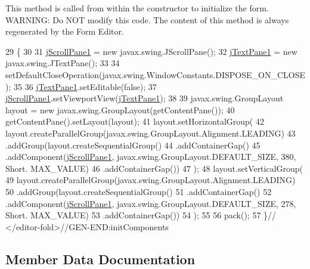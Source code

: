 This method is called from within the constructor to initialize the form. W\+A\+R\+N\+I\+NG\+: Do N\+OT modify this code. The content of this method is always regenerated by the Form Editor. 
\begin{DoxyCode}
29                                   \{
30 
31         \mbox{\hyperlink{class_interfaz_1_1_mensaje_a7da6f30c05a1006cde5b42ccfb671ee9}{jScrollPane1}} = \textcolor{keyword}{new} javax.swing.JScrollPane();
32         \mbox{\hyperlink{class_interfaz_1_1_mensaje_abbd0afdc912a7465ded350b063ae1a4e}{jTextPane1}} = \textcolor{keyword}{new} javax.swing.JTextPane();
33 
34         setDefaultCloseOperation(javax.swing.WindowConstants.DISPOSE\_ON\_CLOSE);
35 
36         \mbox{\hyperlink{class_interfaz_1_1_mensaje_abbd0afdc912a7465ded350b063ae1a4e}{jTextPane1}}.setEditable(\textcolor{keyword}{false});
37         \mbox{\hyperlink{class_interfaz_1_1_mensaje_a7da6f30c05a1006cde5b42ccfb671ee9}{jScrollPane1}}.setViewportView(\mbox{\hyperlink{class_interfaz_1_1_mensaje_abbd0afdc912a7465ded350b063ae1a4e}{jTextPane1}});
38 
39         javax.swing.GroupLayout layout = \textcolor{keyword}{new} javax.swing.GroupLayout(getContentPane());
40         getContentPane().setLayout(layout);
41         layout.setHorizontalGroup(
42             layout.createParallelGroup(javax.swing.GroupLayout.Alignment.LEADING)
43             .addGroup(layout.createSequentialGroup()
44                 .addContainerGap()
45                 .addComponent(\mbox{\hyperlink{class_interfaz_1_1_mensaje_a7da6f30c05a1006cde5b42ccfb671ee9}{jScrollPane1}}, javax.swing.GroupLayout.DEFAULT\_SIZE, 380, Short.
      MAX\_VALUE)
46                 .addContainerGap())
47         );
48         layout.setVerticalGroup(
49             layout.createParallelGroup(javax.swing.GroupLayout.Alignment.LEADING)
50             .addGroup(layout.createSequentialGroup()
51                 .addContainerGap()
52                 .addComponent(\mbox{\hyperlink{class_interfaz_1_1_mensaje_a7da6f30c05a1006cde5b42ccfb671ee9}{jScrollPane1}}, javax.swing.GroupLayout.DEFAULT\_SIZE, 278, Short.
      MAX\_VALUE)
53                 .addContainerGap())
54         );
55 
56         pack();
57     \}\textcolor{comment}{// </editor-fold>//GEN-END:initComponents}
\end{DoxyCode}


\subsection{Member Data Documentation}
\mbox{\label{class_interfaz_1_1_mensaje_a7da6f30c05a1006cde5b42ccfb671ee9}} 
